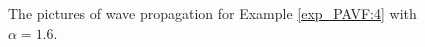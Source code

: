 \begin{figure}[H]
\begin{center}
{		} \caption{The pictures of wave propagation for Example \ref{exp_PAVF:4} with $\alpha=1.6.$}\label{fig_PAVF:14}
		\end{center}
		\end{figure}

